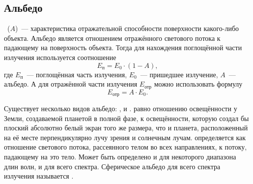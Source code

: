 \subsection{Альбедо}
~($A$)~--- характеристика отражательной способности поверхности какого-либо объекта. Альбедо является отношением отражённого светового потока к падающему на поверхность объекта. Тогда для нахождения поглощённой части излучения используется соотношение
\begin{equation}
E_\text{п} = E_0 \cdot (1-A),
\end{equation}
где $E_{\text{п}}$~--- поглощённая часть излучения, $E_0$~--- пришедшее излучение, $A$~--- альбедо. А для отражённой части излучения $E_{\text{отр}}$ можно использовать формулу
\begin{equation}
	E_{\text{отр}}= A \cdot E_0.
\end{equation}

Существует несколько видов альбедо: ,  и .  равно отношению освещённости у Земли, создаваемой планетой в полной фазе, к освещённости, которую создал бы плоский абсолютно белый экран того же размера, что и планета, расположенный на её месте перпендикулярно лучу зрения и солнечным лучам.  определяется как отношение светового потока, рассеянного телом во всех направлениях, к потоку, падающему на это тело. Может быть определено и для некоторого диапазона длин волн, и для всего спектра. Сферическое альбедо для всего спектра излучения называется .